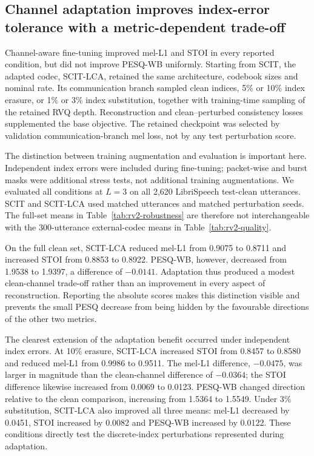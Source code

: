 \subsection{Channel adaptation improves index-error tolerance with a metric-dependent trade-off}
\label{sec:rv2-robustness}
Channel-aware fine-tuning improved mel-L1 and STOI in every reported condition, but did not improve PESQ-WB uniformly. Starting from SCIT, the adapted codec, SCIT-LCA, retained the same architecture, codebook sizes and nominal rate. Its communication branch sampled clean indices, 5\% or 10\% index erasure, or 1\% or 3\% index substitution, together with training-time sampling of the retained RVQ depth. Reconstruction and clean--perturbed consistency losses supplemented the base objective. The retained checkpoint was selected by validation communication-branch mel loss, not by any test perturbation score.

The distinction between training augmentation and evaluation is important here. Independent index errors were included during fine-tuning; packet-wise and burst masks were additional stress tests, not additional training augmentations. We evaluated all conditions at $L=3$ on all 2,620 LibriSpeech test-clean utterances. SCIT and SCIT-LCA used matched utterances and matched perturbation seeds. The full-set means in Table~\ref{tab:rv2-robustness} are therefore not interchangeable with the 300-utterance external-codec means in Table~\ref{tab:rv2-quality}.



On the full clean set, SCIT-LCA reduced mel-L1 from 0.9075 to 0.8711 and increased STOI from 0.8853 to 0.8922. PESQ-WB, however, decreased from 1.9538 to 1.9397, a difference of $-0.0141$. Adaptation thus produced a modest clean-channel trade-off rather than an improvement in every aspect of reconstruction. Reporting the absolute scores makes this distinction visible and prevents the small PESQ decrease from being hidden by the favourable directions of the other two metrics.

The clearest extension of the adaptation benefit occurred under independent index errors. At 10\% erasure, SCIT-LCA increased STOI from 0.8457 to 0.8580 and reduced mel-L1 from 0.9986 to 0.9511. The mel-L1 difference, $-0.0475$, was larger in magnitude than the clean-channel difference of $-0.0364$; the STOI difference likewise increased from 0.0069 to 0.0123. PESQ-WB changed direction relative to the clean comparison, increasing from 1.5364 to 1.5549. Under 3\% substitution, SCIT-LCA also improved all three means: mel-L1 decreased by 0.0451, STOI increased by 0.0082 and PESQ-WB increased by 0.0122. These conditions directly test the discrete-index perturbations represented during adaptation.


